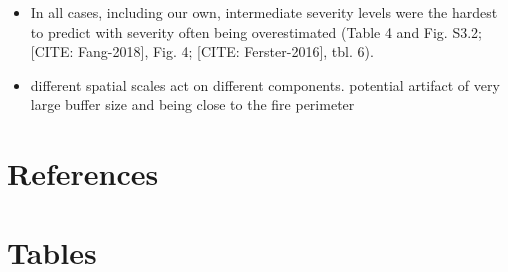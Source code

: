 \documentclass[
  numafflabel,
  authoryear,
  preprint]{elsarticle}
\providecommand{\tightlist}{%
  \setlength{\itemsep}{0pt}\setlength{\parskip}{0pt}}
\begin{document}
\begin{itemize}
  \begin{itemize}
  \tightlist
  \item
    At the local scale (disregarding differences between distinct fire
    events and looking at cells within a perimeter) landscape variables
    may be playing a more important role in explaining differences in
    severity levels.
  \item
    we can use it to predict severity while taking into account the
    effect of drivers on extreme events (zero and ones)
  \end{itemize}
\item
  In all cases, including our own, intermediate severity levels were the
  hardest to predict with severity often being overestimated (Table 4
  and Fig. S3.2; {[}CITE: Fang-2018{]}, Fig. 4; {[}CITE:
  Ferster-2016{]}, tbl. 6).
\item
  different spatial scales act on different components. potential
  artifact of very large buffer size and being close to the fire
  perimeter
\end{itemize}

\section*{References}\label{references}

\section{Tables}\label{tables}

\newpage{}
\end{document}
